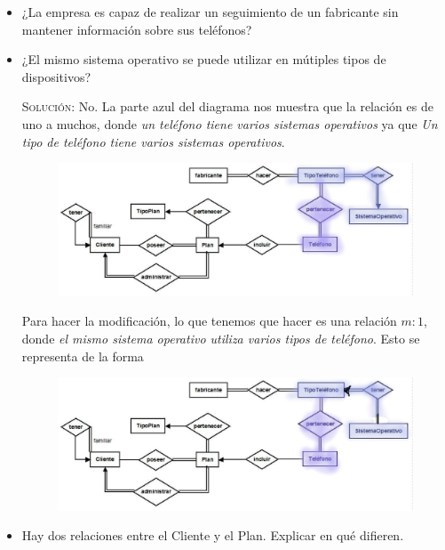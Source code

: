 \documentclass[letterpaper,11pt]{article}
\begin{document}
\begin{itemize}
    \item ¿La empresa es capaz de realizar un seguimiento de un fabricante sin 
    mantener información sobre sus teléfonos?

    \item ¿El mismo sistema operativo se puede utilizar en mútiples tipos de  
    dispositivos? 

    \textsc{Solución:} No. La parte azul del diagrama nos muestra que la 
    relación es de uno a muchos, donde \textit{un teléfono tiene varios 
    sistemas operativos} ya que \textit{Un tipo de teléfono tiene varios 
    sistemas operativos}. 

    \begin{figure}[H]
        \centering
        \includegraphics[scale=0.4]{./imagenes/modelo9.jpg}
    \end{figure}

    Para hacer la modificación, lo que tenemos que hacer es una relación $m:1$, 
    donde \textit{el mismo sistema operativo utiliza varios tipos de teléfono}.
    Esto se representa de la forma

    \begin{figure}[H]
        \centering
        \includegraphics[scale=0.4]{./imagenes/modelo9i.jpg}
    \end{figure}

    \item Hay dos relaciones entre el Cliente y el Plan. Explicar en qué 
    difieren.


\end{itemize}
\end{document}
